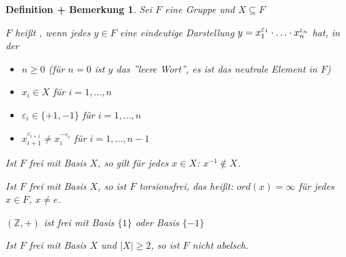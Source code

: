 \documentclass[a4paper,10pt,german]{scrbook}
\theoremstyle{saetze}
\theoremstyle{definitionen}
\newtheorem{DefBem}[Def]{Definition + Bemerkung}
\begin{document}
\begin{DefBem}
    Sei $F$ eine Gruppe und $X \subseteq F$
    \begin{enum}
        \item $F$ heißt ,
        wenn jedes $y
        \in F$ eine eindeutige Darstellung $y = x_1^{\varepsilon_1} \cd
        \dots \cd x_n^{\varepsilon_n}$ hat, in der
        \begin{itemize}
            \item $n \geq 0$ (f\"ur $n=0$ ist $y$ das ''leere Wort'', es ist das neutrale
            Element in $F$)

            \item $x_i \in X$ für $i=1,\dots,n$

            \item $\varepsilon_i \in \{+1,-1\}$ für $i=1,\dots,n$

            \item $x_{i+1}^{\varepsilon_{i+1}} \neq x_i^{-\varepsilon_i}$ für $i
             =1,\dots,n-1$
        \end{itemize}

        \item Ist $F$ frei mit Basis $X$, so gilt für jedes $x \in X$:  $x^{-1}
        \not \in X$.
        \item Ist $F$ frei mit Basis $X$, so ist $F$ torsionsfrei, das heißt: $ord(x) = \infty$ für jedes $x\in F$, $x\ne e$.

        \item $(\mathbb{Z},+)$ ist frei mit Basis $\{1\}$ oder Basis $\{-1\}$

        \item Ist $F$ frei mit Basis $X$ und $|X| \geq 2$, so ist $F$ nicht 
        abelsch. 
        
    \end{enum}
\end{DefBem}
\end{document}
